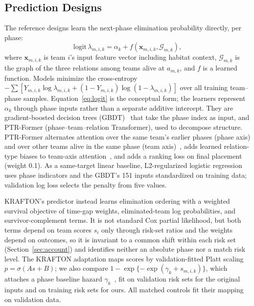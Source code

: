 \documentclass[sigconf,anonymous,nonacm]{acmart}
\begin{document}
\subsection{Prediction Designs}
\label{sec:method:rq2}
The reference designs learn the next-phase elimination probability directly, per phase:
\begin{equation}
\mathrm{logit}\,\lambda_{m,i,k}=\alpha_k+f(\mathbf{x}_{m,i,k},\mathcal{G}_{m,k}),
\label{eq:logit}
\end{equation}
where $\mathbf{x}_{m,i,k}$ is team $i$'s input feature vector including habitat context, $\mathcal{G}_{m,k}$ is the graph of the three relations among teams alive at $a_{m,k}$, and $f$ is a learned function.
Models minimize the cross-entropy $-\sum[Y_{m,i,k}\log\lambda_{m,i,k}+(1-Y_{m,i,k})\log(1-\lambda_{m,i,k})]$ over all training team--phase samples.
Equation~\eqref{eq:logit} is the conceptual form; the learners represent $\alpha_k$ through phase inputs rather than a separate additive intercept. They are gradient-boosted decision trees (GBDT)~\cite{Friedman01} that take the phase index as input, and PTR-Former (phase--team--relation Transformer), used to decompose structure.
PTR-Former alternates attention over the same team's earlier phases (phase axis) and over other teams alive in the same phase (team axis)~\cite{Vaswani17,Ngiam22}, adds learned relation-type biases to team-axis attention~\cite{Ying21,Xenopoulos21}, and adds a ranking loss on final placement (weight 0.1). As a same-target linear baseline, L2-regularized logistic regression uses phase indicators and the GBDT's 151 inputs standardized on training data; validation log loss selects the penalty from five values.

KRAFTON's predictor instead learns elimination ordering with a weighted survival objective of time-gap weights, eliminated-team log probabilities, and survivor-complement terms. It is not standard Cox partial likelihood, but both terms depend on team scores $s_i$ only through risk-set ratios and the weights depend on outcomes, so it is invariant to a common shift within each risk set (Section~\ref{sec:account}) and identifies neither an absolute phase nor a match risk level. The KRAFTON adaptation maps scores by validation-fitted Platt scaling $p=\sigma(A s+B)$; we also compare $1-\exp\{-\exp(\gamma_k+s_{m,i,k})\}$, which attaches a phase baseline hazard $\gamma_k$~\cite{PrenticeGloeckler78}, fit on validation risk sets for the original inputs and on training risk sets for ours. All matched controls fit their mapping on validation data.
\end{document}
